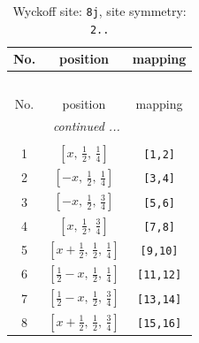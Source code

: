 \documentclass[fleqn,8pt]{jsarticle}
\begin{document}
\begin{longtable}{ccc}
\caption{Wyckoff site: {\tt 8j}, site symmetry: {\tt 2..}}
 \\
 \hline \hline
No. & position & mapping \\ \hline \endfirsthead

\multicolumn{2}{l}{\tablename\ \thetable{}} \\
 \hline \hline
No. & position & mapping \\ \hline \endhead

 \hline \hline
\multicolumn{2}{r}{\footnotesize\it continued ...} \\ \endfoot

 \hline \hline
\multicolumn{2}{r}{} \\ \endlastfoot

1 & $\left[ x,\, \frac{1}{2},\, \frac{1}{4} \right]$ & {\tt [1,2]} \\ \hline
2 & $\left[ - x,\, \frac{1}{2},\, \frac{1}{4} \right]$ & {\tt [3,4]} \\ \hline
3 & $\left[ - x,\, \frac{1}{2},\, \frac{3}{4} \right]$ & {\tt [5,6]} \\ \hline
4 & $\left[ x,\, \frac{1}{2},\, \frac{3}{4} \right]$ & {\tt [7,8]} \\ \hline
5 & $\left[ x + \frac{1}{2},\, \frac{1}{2},\, \frac{1}{4} \right]$ & {\tt [9,10]} \\ \hline
6 & $\left[ \frac{1}{2} - x,\, \frac{1}{2},\, \frac{1}{4} \right]$ & {\tt [11,12]} \\ \hline
7 & $\left[ \frac{1}{2} - x,\, \frac{1}{2},\, \frac{3}{4} \right]$ & {\tt [13,14]} \\ \hline
8 & $\left[ x + \frac{1}{2},\, \frac{1}{2},\, \frac{3}{4} \right]$ & {\tt [15,16]} \\
\end{longtable}
\renewcommand{\arraystretch}{1.2}
\end{document}
